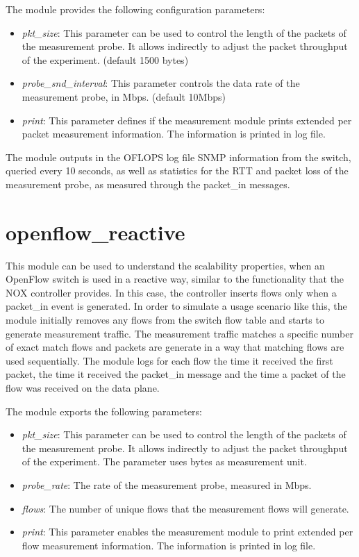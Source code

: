 \documentclass{book}
\begin{document}
  The module provides the following configuration parameters:
  \begin{itemize}
  \item \emph{pkt\_size}:  This parameter can be used to control the length of the
  packets of the measurement probe. It allows indirectly to adjust the packet
throughput of the experiment. (default 1500 bytes)
  \item \emph{probe\_snd\_interval}: This parameter controls the data rate of the
measurement probe, in Mbps. (default 10Mbps)
  \item \emph{print}: This parameter defines if the measurement module prints
  extended per packet measurement information. The information is printed in log
  file. 
  \end{itemize}

  The module outputs in the OFLOPS log file SNMP information from the 
  switch, queried every 10 seconds, as well as statistics for the RTT and packet 
  loss of the measurement probe, as measured through the packet\_in messages.

  \section{openflow\_reactive}

  This module can be used to understand the scalability properties, when an
  OpenFlow switch is used in a reactive way, similar to the functionality that the NOX
  controller provides. In this case, the controller inserts flows only when a
  packet\_in event is generated. In order to simulate a usage scenario like 
  this, the module initially removes any flows from the switch flow table and starts to generate
  measurement traffic. The measurement traffic matches a specific number of
  exact match flows and packets are generate in a way that matching flows are
  used sequentially. The module logs for each flow the time it received the first
  packet, the time it received the packet\_in message and the time a packet of the
  flow was received on the data plane. 

  The module exports the following parameters:
  \begin{itemize}
  \item \emph{pkt\_size}: This parameter can be used to control the length of the
  packets of the measurement probe. It allows indirectly to adjust the packet
  throughput of the experiment. The parameter uses bytes as measurement unit.
  \item \emph{probe\_rate}: The rate of the measurement probe, measured in Mbps. 
  \item \emph{flows}: The number of unique flows that the measurement flows will
  generate.
  \item \emph{print}:  This parameter enables the measurement module to print
  extended per flow measurement information. The information is printed in log
  file.
  \end{itemize}
\end{document}
